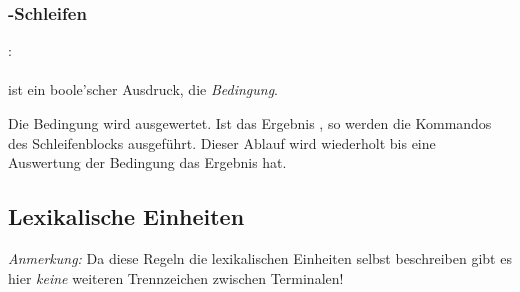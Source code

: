 
\subsubsection{-Schleifen}\label{$_backslash$kw__while__-Schleifen}
:\label{schleife_while}\\
\hspace*{1cm}\Gspace\Gt{(}\Gspace{} \Gspace\Gt{)}\Gspace\Gt{\{}\Gspace{} \Gspace\Gt{\}}\\

\glq{}\grq ist ein boole'scher Ausdruck, die \emph{Bedingung}.

Die Bedingung wird ausgewertet. Ist das Ergebnis , so werden die Kommandos des Schleifenblocks
ausgeführt. Dieser Ablauf wird wiederholt bis eine Auswertung der Bedingung das Ergebnis  hat.


\subsection{Lexikalische Einheiten}\label{Lexikalische Einheiten}

\emph{Anmerkung:} Da diese Regeln die lexikalischen Einheiten selbst beschreiben gibt es
hier \emph{keine} weiteren Trennzeichen zwischen Terminalen!


